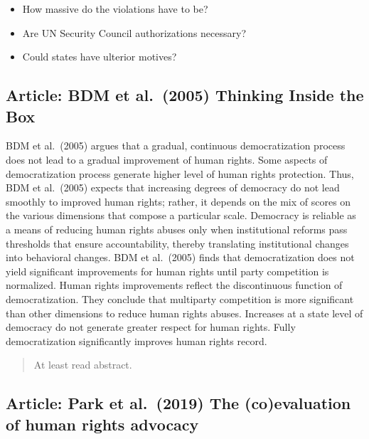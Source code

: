 \documentclass[
]{book}
\begin{document}
\begin{itemize}
\item
  How massive do the violations have to be?
\item
  Are UN Security Council authorizations necessary?
\item
  Could states have ulterior motives?
\end{itemize}

\hypertarget{article-bdm-et-al.-2005-thinking-inside-the-box}{%
\subsection{Article: BDM et al.~(2005) Thinking Inside the Box}\label{article-bdm-et-al.-2005-thinking-inside-the-box}}

BDM et al.~(2005) argues that a gradual, continuous democratization process does not lead to a gradual improvement of human rights. Some aspects of democratization process generate higher level of human rights protection. Thus, BDM et al.~(2005) expects that increasing degrees of democracy do not lead smoothly to improved human rights; rather, it depends on the mix of scores on the various dimensions that compose a particular scale. Democracy is reliable as a means of reducing human rights abuses only when institutional reforms pass thresholds that ensure accountability, thereby translating institutional changes into behavioral changes. BDM et al.~(2005) finds that democratization does not yield significant improvements for human rights until party competition is normalized. Human rights improvements reflect the discontinuous function of democratization. They conclude that multiparty competition is more significant than other dimensions to reduce human rights abuses. Increases at a state level of democracy do not generate greater respect for human rights. Fully democratization significantly improves human rights record.

\begin{quote}
At least read abstract.
\end{quote}

\hypertarget{article-park-et-al.-2019-the-coevaluation-of-human-rights-advocacy}{%
\subsection{Article: Park et al.~(2019) The (co)evaluation of human rights advocacy}\label{article-park-et-al.-2019-the-coevaluation-of-human-rights-advocacy}}
\end{document}
